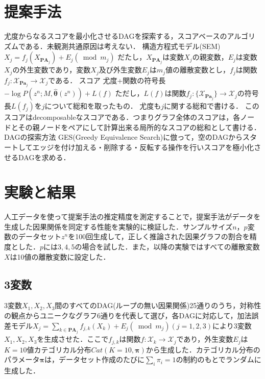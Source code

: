 \documentclass[dvipdfmx]{jsarticle}
\begin{document}
\section{提案手法}


\begin{outline}
尤度からなるスコアを最小化させるDAGを探索する，スコアベースのアルゴリズムである．未観測共通原因は考えない．
\1 構造方程式モデル(SEM)
    \2 $X_j = f_j(X_{\textbf{PA}_j}) + E_j (\bmod m_j)$
        \3 だたし，$X_{\textbf{PA}_j}$は変数$X_j$の親変数，$E_j$は変数$X_j$の外生変数であり，変数$X_j$及び外生変数$E_j$は$m_j$値の離散変数とし，$f_j$は関数$f_j: \mathcal{X}_{\textbf{Pa}_{j}} \to \mathcal{X}_j$である．
\1 スコア
    \2 尤度+関数の符号長
    \2 $- \log P(z^n; M, \hat{\bm{\theta}}(z^n)) + L(f)$
        \3 ただし，$L(f)$は関数$f_j: \{\mathcal{X}_{\textbf{Pa}_{j}}\} \to \mathcal{X}_j$の符号長$L(f_j)$を$j$について総和を取ったもの．
        \3 尤度も$j$に関する総和で書ける．
        \3 このスコアはdecomposableなスコアである．つまりグラフ全体のスコアは，各ノードとその親ノードをペアにして計算出来る局所的なスコアの総和として書ける．
\1 DAGの探索方法
    \2 GES(Greedy Equivalence Search)\cite{hauser2012characterization}に倣って，空のDAGからスタートしてエッジを付け加える・削除する・反転する操作を行いスコアを極小化させるDAGを求める．
\end{outline}

\section{実験と結果}
人工データを使って提案手法の推定精度を測定することで，提案手法がデータを生成した因果関係を同定する性能を実験的に検証した．サンプルサイズ$n$，$p$変数のデータセット$z^n$を100回生成して，正しく推論された因果グラフの割合を精度とした．$p$には$3,4,5$の場合を試した．また，以降の実験ではすべての離散変数$X$は10値の離散変数に設定した．
\subsection{3変数}
3変数$X_1, X_2, X_3$間のすべてのDAG(ループの無い因果関係)25通りのうち，対称性の観点からユニークなグラフ6通りを代表して選び，各DAGに対応して，加法誤差モデル$X_j = \sum_{k \in \textbf{PA}_j}f_{j, k}(X_k) + E_j (\bmod m_j)(j = 1, 2, 3)$により3変数$X_1, X_2, X_3$を生成させた．ここで$f_{j, k}$は関数$f: \mathcal{X}_k \to \mathcal{X}_j$であり，外生変数$E_j$は$K=10$値カテゴリカル分布$Cat(K=10, \bm{\pi})$から生成した．カテゴリカル分布のパラメータ$\bm{\pi}$は，データセット作成のたびに$\sum_i \pi_i = 1$の制約のもとでランダムに生成した．
\end{document}
